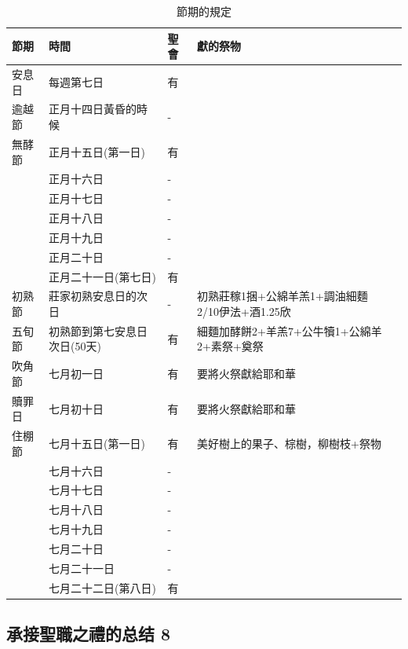 \begin{table}[H] 
\centering
\begin{tabular}{l|l|l|l|l}
\hline
\hline
 節期      &   時間   &  聖會 &    獻的祭物     \\ \hline
安息日& 每週第七日 &  有 \\ \hline
逾越節& 正月十四日黃昏的時候 &- \\ \hline
無酵節&正月十五日(第一日)&  有&\\
      &正月十六日&  -&\\
      &正月十七日& - & \\
      &正月十八日& -  &\\
      &正月十九日& -&  \\
      &正月二十日&  -  &  \\          
      &正月二十一日(第七日)&  有&\\ \hline
初熟節&莊家初熟安息日的次日& - &初熟莊稼1捆+公綿羊羔1+調油細麵2/10伊法+酒1.25欣 \\ \hline
五旬節&初熟節到第七安息日次日(50天)& 有 &細麵加酵餅2+羊羔7+公牛犢1+公綿羊2+素祭+奠祭 \\ \hline
吹角節&七月初一日& 有 & 要將火祭獻給耶和華\\ \hline
贖罪日&七月初十日& 有 &要將火祭獻給耶和華\\ \hline
住棚節&七月十五日(第一日)& 有 & 美好樹上的果子、棕樹，柳樹枝+祭物\\
      &七月十六日& - & \\
      &七月十七日& - & \\
      &七月十八日& - & \\
      &七月十九日& - &  \\     
      &七月二十日& - & \\
      &七月二十一日& - &  \\
      &七月二十二日(第八日)& 有 &   \\  \hline                    
\end{tabular}
\caption{節期的規定}
\end{table}





\subsection{承接聖職之禮的总结 8}


